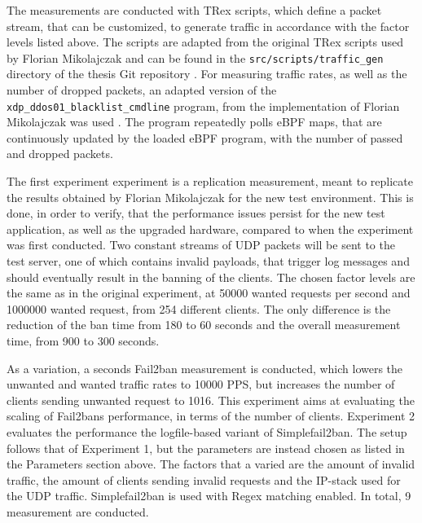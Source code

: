 The measurements are conducted with TRex scripts, which define a packet stream, that can be customized, to generate traffic
in accordance with the factor levels listed above. The scripts are adapted from the original TRex scripts used by Florian Mikolajczak
and can be found in the \texttt{src/scripts/traffic\_gen} directory of the thesis Git repository \cite{gitlab}. 
For measuring traffic rates, as well as the number of dropped packets, an adapted version of the \texttt{xdp\_ddos01\_blacklist\_cmdline} program,
from the implementation of Florian Mikolajczak was used \cite{mikolajczak2022}. The program repeatedly polls \ac{eBPF} maps,
that are continuously updated by the loaded \ac{eBPF} program, with the number of passed and dropped packets.  
\par
{}
The first experiment experiment is a replication measurement, meant to replicate the results obtained by Florian Mikolajczak
for the new test environment. This is done, in order to verify, that the performance issues persist for the new test application,
as well as the upgraded hardware, compared to when the experiment was first conducted. Two constant streams of UDP packets will be sent to
the test server, one of which contains invalid payloads, that trigger log messages and should eventually result in the banning of the clients. The chosen factor levels are the same as in the 
original experiment, at 50000 wanted requests per second and 1000000 wanted request, from 254 different clients. The only difference is the reduction of the 
ban time from 180 to 60 seconds and the overall measurement time, from 900 to 300 seconds.
\par
As a variation, a seconds Fail2ban measurement is conducted, which lowers the unwanted and wanted traffic rates to 10000 \ac{PPS},
but increases the number of clients sending unwanted request to 1016. This experiment aims at evaluating the scaling of Fail2bans performance, in terms
of the number of clients.
Experiment 2 evaluates the performance the logfile-based variant of Simplefail2ban. The setup follows that of Experiment 1, but the parameters 
are instead chosen as listed in the Parameters section above. The factors that a varied are the amount of invalid traffic, the amount of clients 
sending invalid requests and the \ac{IP}-stack used for the \ac{UDP} traffic. Simplefail2ban is used with \ac{Regex} matching enabled. In total, 9 measurement are conducted.    
